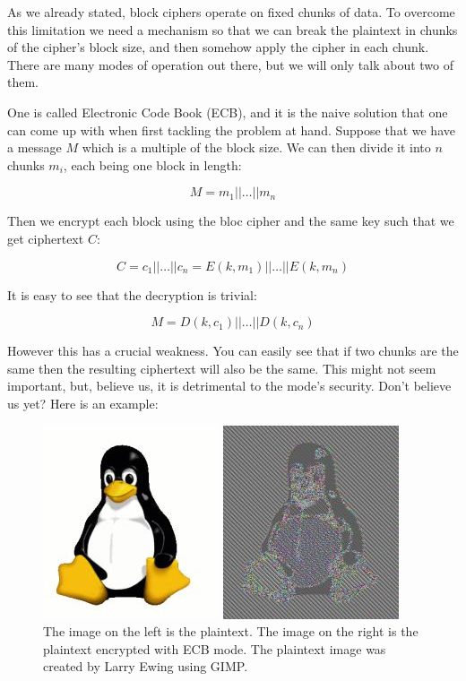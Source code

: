 As we already stated, block ciphers operate on fixed chunks of data.
To overcome this limitation we need a mechanism so that we can break the plaintext in chunks of the cipher's block size, and then somehow apply the cipher in each chunk.
There are many modes of operation out there, but we will only talk about two of them.

One is called Electronic Code Book (ECB), and it is the naive solution that one can come up with when first tackling the problem at hand.
Suppose that we have a message $M$ which is a multiple of the block size.
We can then divide it into $n$ chunks $m_i$, each being one block in length:

\[
  M = m_1 || \dots || m_n
\]

Then we encrypt each block using the bloc cipher and the same key such that we get ciphertext $C$:

\[
  C = c_1 || \dots || c_n =  E(k,m_1) || \dots || E(k,m_n)
\]

It is easy to see that the decryption is trivial:

\[
  M = D(k, c_1) || \dots || D(k, c_n)
\]

However this has a crucial weakness.
You can easily see that if two chunks are the same then the resulting ciphertext will also be the same.
This might not seem important, but, believe us, it is detrimental to the mode's security.
Don't believe us yet? Here is an example:

\begin{figure}[h]
  \begin{minipage}{0.49\textwidth}
    \includegraphics[scale=0.8]{Figures/Tux.jpg}
  \end{minipage}
  \begin{minipage}{0.49\textwidth}
    \includegraphics[scale=0.8]{Figures/Tux_ecb.jpg}
  \end{minipage}
  \caption[ECB in practice]{The image on the left is the plaintext. The image on the right is the plaintext encrypted with ECB mode. The plaintext image was created by Larry Ewing using GIMP.}
\end{figure}

